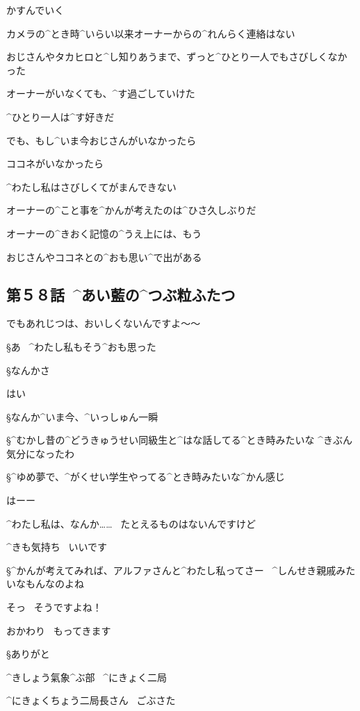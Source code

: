 \A かすんでいく

\page[38]
\A カメラの^{とき}{時}^{いらい}{以来}オーナーからの^{れんらく}{連絡}はない

\page
\A おじさんやタカヒロと^{し}{知}りあうまで、ずっと^{ひとり}{一人}でもさびしくなかった

\A オーナーがいなくても、^{す}{過}ごしていけた

\A ^{ひとり}{一人}は^{す}{好}きだ

\A でも、もし^{いま}{今}おじさんがいなかったら

\A ココネがいなかったら

\A ^{わたし}{私}はさびしくてがまんできない

\page
\A オーナーの^{こと}{事}を^{かんが}{考}えたのは^{ひさ}{久}しぶりだ

\A オーナーの^{きおく}{記憶}の^{うえ}{上}には、もう

\A おじさんやココネとの^{おも}{思}い^{で}{出}がある


\subsection{第５８話\ ^{あい}{藍}の^{つぶ}{粒}ふたつ}

\page[43]
\A でもあれじつは、おいしくないんですよ〜〜

\S あ
\ ^{わたし}{私}もそう^{おも}{思}った

\page
\S なんかさ

\A はい

\S なんか^{いま}{今}、^{いっしゅん}{一瞬}

\S ^{むかし}{昔}の^{どうきゅうせい}{同級生}と^{はな}{話}してる^{とき}{時}みたいな
^{きぶん}{気分}になったわ

\S ^{ゆめ}{夢}で、^{がくせい}{学生}やってる^{とき}{時}みたいな^{かん}{感}じ

\A はーー

\page
\A ^{わたし}{私}は、なんか……
\ たとえるものはないんですけど

\A ^{きも}{気持}ち
\ いいです

\page
\S ^{かんが}{考}えてみれば、アルファさんと^{わたし}{私}ってさー
\ ^{しんせき}{親戚}みたいなもんなのよね

\A そっ
\ そうですよね！

\page
\A おかわり
\ もってきます

\S ありがと

\page[49]
\Sign ^{きしょう}{氣象}^{ぶ}{部}
\ ^{にきょく}{二局}

\page
\AM ^{にきょくちょう}{二局長}さん
\ ごぶさた

